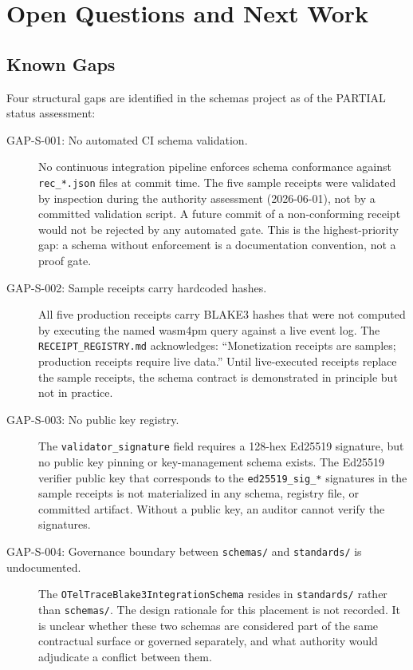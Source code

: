 
\section{Open Questions and Next Work}
\label{sec:schemas-open-questions}

\subsection{Known Gaps}
\label{sec:schemas-open-questions-gaps}

Four structural gaps are identified in the schemas project as of the PARTIAL status assessment:

\begin{description}
  \item[GAP-S-001: No automated CI schema validation.] No continuous integration pipeline
    enforces schema conformance against \texttt{rec\_*.json} files at commit time. The five
    sample receipts were validated by inspection during the authority assessment (2026-06-01),
    not by a committed validation script. A future commit of a non-conforming receipt would not
    be rejected by any automated gate. This is the highest-priority gap: a schema without
    enforcement is a documentation convention, not a proof gate.
  \item[GAP-S-002: Sample receipts carry hardcoded hashes.] All five production receipts carry
    BLAKE3 hashes that were not computed by executing the named wasm4pm query against a live
    event log. The \texttt{RECEIPT\_REGISTRY.md} acknowledges: ``Monetization receipts are
    samples; production receipts require live data.'' Until live-executed receipts replace the
    sample receipts, the schema contract is demonstrated in principle but not in practice.
  \item[GAP-S-003: No public key registry.] The \texttt{validator\_signature} field requires a
    128-hex Ed25519 signature, but no public key pinning or key-management schema exists. The
    Ed25519 verifier public key that corresponds to the \texttt{ed25519\_sig\_*} signatures in
    the sample receipts is not materialized in any schema, registry file, or committed artifact.
    Without a public key, an auditor cannot verify the signatures.
  \item[GAP-S-004: Governance boundary between \texttt{schemas/} and \texttt{standards/}
    is undocumented.] The \texttt{OTelTraceBlake3IntegrationSchema} resides in \texttt{standards/}
    rather than \texttt{schemas/}. The design rationale for this placement is not recorded.
    It is unclear whether these two schemas are considered part of the same contractual surface
    or governed separately, and what authority would adjudicate a conflict between them.
\end{description}

